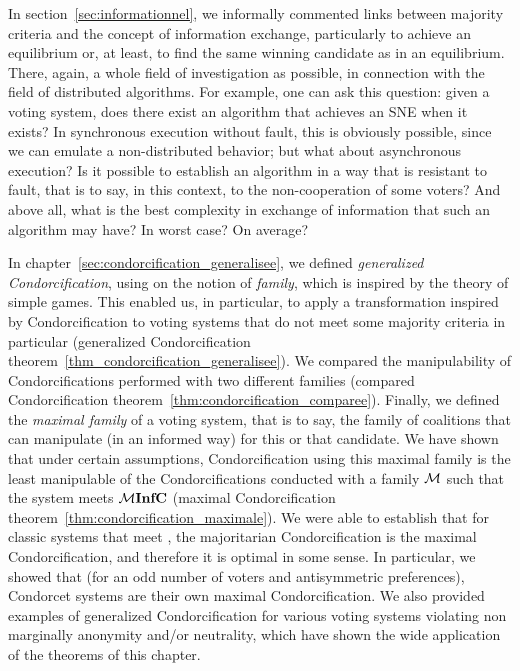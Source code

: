 In section~\ref{sec:informationnel}, we informally commented links between majority criteria and the concept of information exchange, particularly to achieve an equilibrium or, at least, to find the same winning candidate as in an equilibrium. There, again, a whole field of investigation as possible, in connection with the field of distributed algorithms. For example, one can ask this question: given a voting system, does there exist an algorithm that achieves an SNE when it exists? In synchronous execution without fault, this is obviously possible, since we can emulate a non-distributed behavior; but what about asynchronous execution? Is it possible to establish an algorithm in a way that is resistant to fault, that is to say, in this context, to the non-cooperation of some voters? And above all, what is the best complexity in exchange of information that such an algorithm may have? In worst case? On average?

\medskip
In chapter~\ref{sec:condorcification_generalisee}, we defined \emph{generalized Condorcification}, using on the notion of \emph{family}, which is inspired by the theory of simple games. This enabled us, in particular, to apply a transformation inspired by Condorcification to voting systems that do not meet some majority criteria in particular (generalized Condorcification theorem~\ref{thm_condorcification_generalisee}). We compared the manipulability of Condorcifications performed with two different families (compared Condorcification theorem~\ref{thm:condorcification_comparee}). Finally, we defined the \emph{maximal family} of a voting system, that is to say, the family of coalitions that can manipulate (in an informed way) for this or that candidate. We have shown that under certain assumptions, Condorcification using this maximal family is the least manipulable of the Condorcifications conducted with a family $ \mathcal{M} $ such that the system meets $ \mathcal{M}\mathbf{InfC}{} $ (maximal Condorcification theorem~\ref{thm:condorcification_maximale}). We were able to establish that for classic systems that meet \cminf{}, the majoritarian Condorcification is the maximal Condorcification, and therefore it is optimal in some sense. In particular, we showed that (for an odd number of voters and antisymmetric preferences), Condorcet systems are their own maximal Condorcification. We also provided examples of generalized Condorcification for various voting systems violating non marginally anonymity and/or neutrality, which have shown the wide application of the theorems of this chapter.

